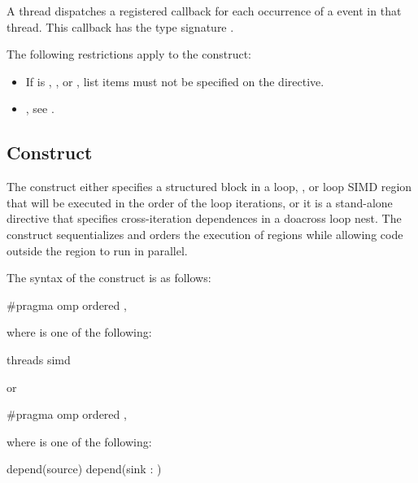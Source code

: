 \tools

A thread dispatches a registered  callback
for each occurrence of a  event in that thread. This
callback has the type signature .

\restrictions

The following restrictions apply to the  construct:

\begin{itemize}
\item If  is , , or
    , list items must not be specified on the  directive.
\end{itemize}

\crossreferences
\begin{itemize}
\item {}, see
.
\end{itemize}





\subsection{ Construct}
\label{subsec:ordered Construct}
\summary
The  construct either specifies a structured block in a loop,
, or loop SIMD region that will be executed in the order of the
loop iterations, or it is a stand-alone directive that specifies
cross-iteration dependences in a doacross loop nest. The 
construct sequentializes and orders the execution of  regions
while allowing code outside the region to run in parallel.

\begin{samepage}
\syntax
\begin{ccppspecific}
The syntax of the  construct is as follows:

\begin{boxedcode}
\#pragma omp ordered \plc{[clause[ [},\plc{] clause] ]} 
\end{boxedcode}

where  is one of the following:
\begin{indentedcodelist}
threads
simd
\end{indentedcodelist}

or

\begin{boxedcode}
\#pragma omp ordered \plc{clause [[[},\plc{] clause] ... ]} 
\end{boxedcode}
where  is one of the following:
\begin{indentedcodelist}
depend(source)
depend(sink : )
\end{indentedcodelist}


\end{ccppspecific}
\end{samepage}


